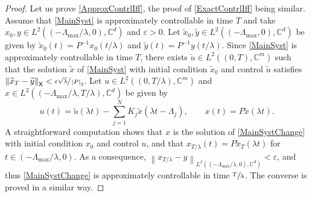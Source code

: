 \documentclass[JEP,XML,SOM,Unicode]{cedram}
\theoremstyle{plain}
\theoremstyle{definition}
\newcommand{\norm}[1]{\left\lVert #1\right\lVert}
\newcommand{\abs}[1]{\left\lvert #1\right \rvert}
\begin{document}
\begin{proof}
Let us prove \eqref{ApproxContrlIff}, the proof of \eqref{ExactContrlIff} being similar. Assume that \eqref{MainSyst} is approximately controllable in time $T$ and take $x_0, y \in L^2((-\Lambda_{\max}/\lambda, 0), \mathbb C^d)$ and $\varepsilon > 0$. Let $\widetilde x_0, \widetilde{y} \in L^2((-\Lambda_{\max}, 0), \mathbb C^d)$ be given by $\widetilde x_0(t) = P^{-1} x_0(t/\lambda)$ and $\widetilde{y}(t) = P^{-1} y(t/\lambda)$. Since \eqref{MainSyst} is approximately controllable in time $T$, there exists $\widetilde u \in L^2((0, T), \mathbb C^m)$ such that the solution $\widetilde x$ of \eqref{MainSyst} with initial condition $\widetilde x_0$ and control $\widetilde u$ satisfies $\norm{\widetilde x_T - \widetilde{y}}_{\mathsf X} < \sfrac{\varepsilon \sqrt{\lambda}}{\abs{P}_{2}}$. Let $u \in L^2((0, T/\lambda), \mathbb C^m)$ and $x \in L^2((-\Lambda_{\max}/\lambda, T/\lambda), \mathbb C^d)$ be given by
\[
u(t) = \widetilde u(\lambda t) - \sum_{j=1}^N K_j \widetilde x(\lambda t - \Lambda_j), \qquad x(t) = P \widetilde x(\lambda t).
\]
A straightforward computation shows that $x$ is the solution of \eqref{MainSystChange} with initial condition $x_0$ and control $u$, and that $x_{T/\lambda}(t) = P \widetilde x_T(\lambda t)$ for $t \in (-\Lambda_{\max}/\lambda, 0)$. As a consequence,
$\norm{x_{T/\lambda} - y}_{L^2((-\Lambda_{\max}/\lambda, 0), \mathbb C^d)}  < \varepsilon$, and thus \eqref{MainSystChange} is approximately controllable in time $\sfrac{T}{\lambda}$. The converse is proved in a similar way.
\end{proof}
\end{document}

